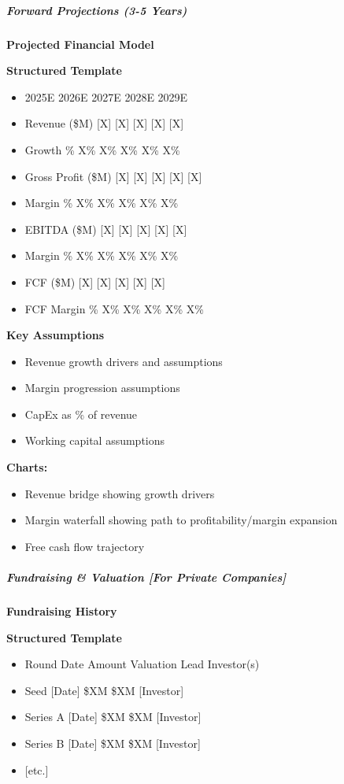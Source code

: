 \documentclass[11pt]{article}
\begin{document}
\subparagraph{Forward Projections (3-5 Years)}\mbox{}\par

\textbf{Projected Financial Model}

\textbf{Structured Template}
\begin{itemize}[leftmargin=*,itemsep=2pt,topsep=2pt]
\item {} 2025E 2026E 2027E 2028E 2029E
\item {} Revenue (\$M) [X] [X] [X] [X] [X]
\item {} Growth \% X\% X\% X\% X\% X\%
\item {} Gross Profit (\$M) [X] [X] [X] [X] [X]
\item {} Margin \% X\% X\% X\% X\% X\%
\item {} EBITDA (\$M) [X] [X] [X] [X] [X]
\item {} Margin \% X\% X\% X\% X\% X\%
\item {} FCF (\$M) [X] [X] [X] [X] [X]
\item {} FCF Margin \% X\% X\% X\% X\% X\%
\end{itemize}

\textbf{Key Assumptions}

\begin{itemize}[leftmargin=*,itemsep=2pt,topsep=2pt]
\item {} Revenue growth drivers and assumptions
\item {} Margin progression assumptions
\item {} CapEx as \% of revenue
\item {} Working capital assumptions
\end{itemize}

\textbf{Charts:}

\begin{itemize}[leftmargin=*,itemsep=2pt,topsep=2pt]
\item {} Revenue bridge showing growth drivers
\item {} Margin waterfall showing path to profitability/margin expansion
\item {} Free cash flow trajectory
\end{itemize}

\subparagraph{Fundraising \& Valuation [For Private Companies]}\mbox{}\par

\textbf{Fundraising History}

\textbf{Structured Template}
\begin{itemize}[leftmargin=*,itemsep=2pt,topsep=2pt]
\item {} Round Date Amount Valuation Lead Investor(s)
\item {} Seed [Date] \$XM \$XM [Investor]
\item {} Series A [Date] \$XM \$XM [Investor]
\item {} Series B [Date] \$XM \$XM [Investor]
\item {} [etc.]
\end{itemize}
\end{document}
